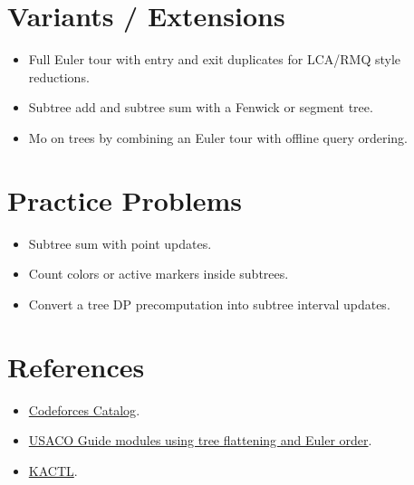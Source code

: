 \section*{Variants / Extensions}

\begin{itemize}
  \item Full Euler tour with entry and exit duplicates for LCA/RMQ style reductions.
  \item Subtree add and subtree sum with a Fenwick or segment tree.
  \item Mo on trees by combining an Euler tour with offline query ordering.
\end{itemize}

\section*{Practice Problems}

\begin{itemize}
  \item Subtree sum with point updates.
  \item Count colors or active markers inside subtrees.
  \item Convert a tree DP precomputation into subtree interval updates.
\end{itemize}

\section*{References}

\begin{itemize}
  \item \href{https://codeforces.com/catalog?locale=en}{Codeforces Catalog}.
  \item \href{https://usaco.guide/plat/sqrt}{USACO Guide modules using tree flattening and Euler order}.
  \item \href{https://github.com/kth-competitive-programming/kactl}{KACTL}.
\end{itemize}
